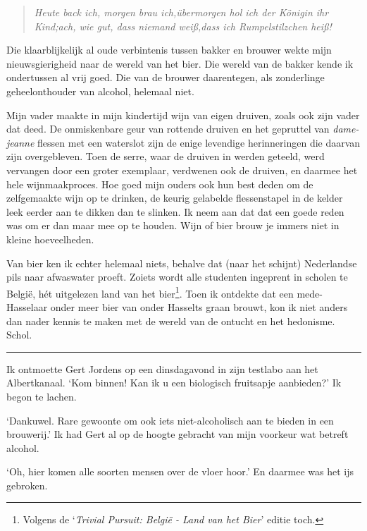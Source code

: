 \documentclass[
  11pt,
  dutch,
]{memoir}
\begin{document}
\begin{quote}
\emph{Heute back ich, morgen brau ich,\newline übermorgen hol ich der
Königin ihr Kind;\newline ach, wie gut, dass niemand weiß,\newline dass
ich Rumpelstilzchen heiß!}
\end{quote}

Die klaarblijkelijk al oude verbintenis tussen bakker en brouwer wekte
mijn nieuwsgierigheid naar de wereld van het bier. Die wereld van de
bakker kende ik ondertussen al vrij goed. Die van de brouwer
daarentegen, als zonderlinge geheelonthouder van alcohol, helemaal niet.

Mijn vader maakte in mijn kindertijd wijn van eigen druiven, zoals ook
zijn vader dat deed. De onmiskenbare geur van rottende druiven en het
gepruttel van \emph{dame-jeanne} flessen met een waterslot zijn de enige
levendige herinneringen die daarvan zijn overgebleven. Toen de serre,
waar de druiven in werden geteeld, werd vervangen door een groter
exemplaar, verdwenen ook de druiven, en daarmee het hele wijnmaakproces.
Hoe goed mijn ouders ook hun best deden om de zelfgemaakte wijn op te
drinken, de keurig gelabelde flessenstapel in de kelder leek eerder aan
te dikken dan te slinken. Ik neem aan dat dat een goede reden was om er
dan maar mee op te houden. Wijn of bier brouw je immers niet in kleine
hoeveelheden.

Van bier ken ik echter helemaal niets, behalve dat (naar het schijnt)
Nederlandse pils naar afwaswater proeft. Zoiets wordt alle studenten
ingeprent in scholen te België, hét uitgelezen land van het
bier\footnote{Volgens de `\emph{Trivial Pursuit: België - Land van het
  Bier}' editie toch.}. Toen ik ontdekte dat een mede-Hasselaar onder
meer bier van onder Hasselts graan brouwt, kon ik niet anders dan nader
kennis te maken met de wereld van de ontucht en het hedonisme. Schol.

\pfbreak

Ik ontmoette Gert Jordens op een dinsdagavond in zijn testlabo aan het
Albertkanaal. `Kom binnen! Kan ik u een biologisch fruitsapje
aanbieden?' Ik begon te lachen.

`Dankuwel. Rare gewoonte om ook iets niet-alcoholisch aan te bieden in
een brouwerij.' Ik had Gert al op de hoogte gebracht van mijn voorkeur
wat betreft alcohol.

`Oh, hier komen alle soorten mensen over de vloer hoor.' En daarmee was
het ijs gebroken.
\end{document}
